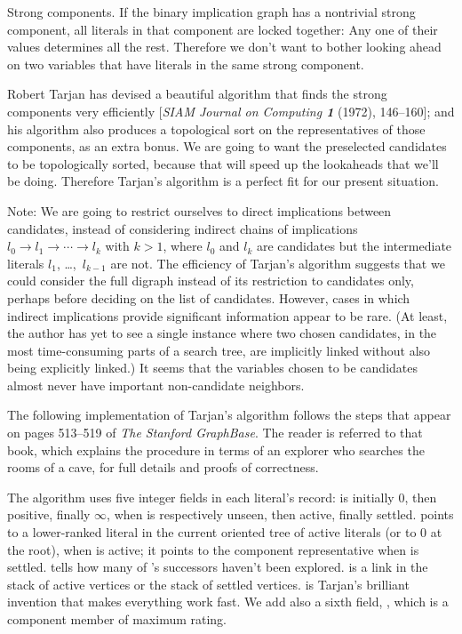 Strong components. If the binary implication graph has a nontrivial
strong component, all literals in that component are locked together:
Any one of their values determines all the rest. Therefore we don't want
to bother looking ahead on two variables that have literals in the
same strong component.

Robert Tarjan has devised a beautiful algorithm that finds the strong
components very efficiently [{\sl SIAM Journal on Computing\/ \bf1} (1972),
146--160]; and his algorithm also produces a topological sort on the
representatives of those components, as an extra bonus. We are going to want
the preselected candidates to be topologically sorted, because that will speed
up the lookaheads that we'll be doing. Therefore Tarjan's algorithm
is a perfect fit for our present situation.

Note: We are going to restrict ourselves to direct implications between
candidates, instead of considering indirect chains of implications
$l_0\to l_1\to \cdots\to l_k$ with $k>1$,
where $l_0$ and $l_k$ are candidates but the intermediate literals
$l_1$, \dots,~$l_{k-1}$ are not. The efficiency of Tarjan's algorithm
suggests that we could consider the full digraph instead of its
restriction to candidates only, perhaps before deciding on the
list of candidates. However, cases in which indirect implications provide
significant information appear to be rare. (At least, the author has yet
to see a single instance where two chosen candidates, in the most
time-consuming parts of a search tree, are implicitly linked without
also being explicitly linked.) It seems that the variables chosen to
be candidates almost never have important non-candidate neighbors.

The following implementation of Tarjan's algorithm follows the
steps that appear on pages 513--519 of {\sl The Stanford GraphBase}.
The reader is referred to that book, which explains the procedure in terms of
an explorer who searches the rooms of a cave, for full details and proofs of
correctness.

The algorithm uses five integer fields in each literal's  record:
\smallskip
{} is initially 0, then positive, finally $\infty$, when  is
respectively unseen, then active, finally settled.
\smallskip
{} points to a lower-ranked literal in the current oriented tree
of
active literals (or to 0 at the root), when  is active; it points
to the component representative when  is settled.
\smallskip
{} tells how many of 's successors haven't been
explored.
\smallskip
{} is a link in the stack of active vertices or the stack of settled
vertices.
\smallskip
{} is Tarjan's brilliant invention that makes everything work fast.
\smallskip\noindent
We add also a sixth field, , which is a component member
of maximum rating.

